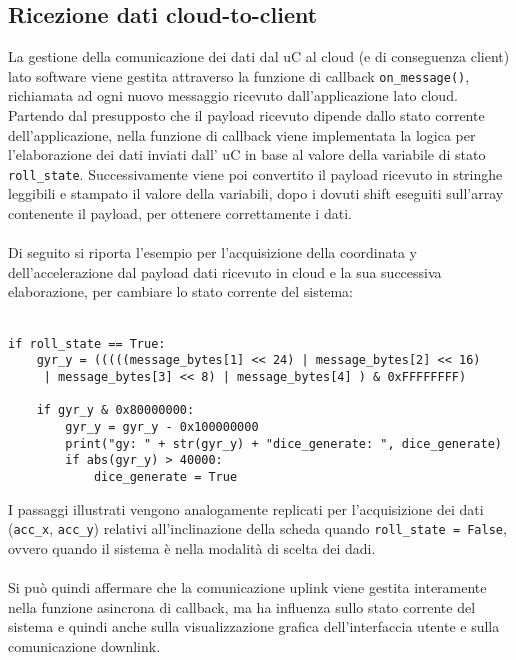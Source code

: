 \subsection{Ricezione dati cloud-to-client}
La gestione della comunicazione dei dati dal uC al cloud (e di conseguenza client) lato software viene gestita attraverso la funzione di callback 
\Verb|on_message()|, richiamata ad ogni nuovo messaggio ricevuto dall'applicazione lato cloud. Partendo dal presupposto che il payload ricevuto
dipende dallo stato corrente dell'applicazione, nella funzione di callback viene implementata la logica per l'elaborazione dei dati inviati dall' uC in base al valore
della variabile di stato \Verb|roll_state|. Successivamente viene poi convertito il payload ricevuto in stringhe leggibili e stampato il valore della variabili, 
dopo i dovuti shift eseguiti sull'array contenente il payload, per ottenere correttamente i dati.
\\\\Di seguito si riporta l'esempio per l'acquisizione della coordinata y dell'accelerazione dal payload dati ricevuto in cloud e la sua 
successiva elaborazione, per cambiare lo stato corrente del sistema:\\\\
\begin{verbatim}
if roll_state == True:
    gyr_y = (((((message_bytes[1] << 24) | message_bytes[2] << 16)
     | message_bytes[3] << 8) | message_bytes[4] ) & 0xFFFFFFFF)  

    if gyr_y & 0x80000000:
        gyr_y = gyr_y - 0x100000000
        print("gy: " + str(gyr_y) + "dice_generate: ", dice_generate)
        if abs(gyr_y) > 40000:
            dice_generate = True
\end{verbatim}
I passaggi illustrati vengono analogamente replicati per l'acquisizione dei dati (\Verb|acc_x|, \Verb|acc_y|) relativi all'inclinazione della scheda
quando \Verb|roll_state = False|, ovvero quando il sistema è nella modalità di scelta dei dadi.
\\\\Si può quindi affermare che la comunicazione uplink viene gestita interamente nella funzione asincrona di callback, ma ha influenza 
sullo stato corrente del sistema e quindi anche sulla visualizzazione grafica dell'interfaccia utente e sulla comunicazione downlink.

